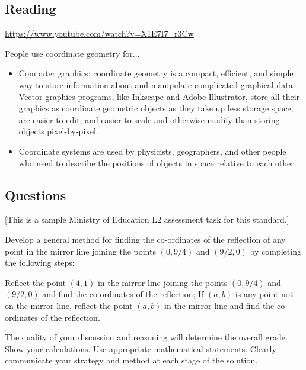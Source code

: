 



\subsection*{Reading}
\begin{center}
\begin{tcolorbox}[width=0.8\textwidth,colback={white},title={\textbf{Go and watch...}},colbacktitle=black,coltitle=white]
  \textcolor{black}{\url{https://www.youtube.com/watch?v=X1E7I7_r3Cw}}
\end{tcolorbox}
\end{center}

\begin{center}
\begin{tcolorbox}[width=0.8\textwidth,colback={white},title={\textbf{What's it good for?}},colbacktitle=MidnightBlue,coltitle=white]
  People use coordinate geometry for...
  \begin{itemize}
    \item Computer graphics: coordinate geometry is a compact, efficient, and simple way to store information about and manipulate
          complicated graphical data. Vector graphics programs, like Inkscape and Adobe Illustrator, store all their graphics as
          coordinate geometric objects as they take up less storage space, are easier to edit, and easier to scale and otherwise modify
          than storing objects pixel-by-pixel.
    \item Coordinate systems are used by physicists, geographers, and other people who need to describe the positions of objects in
          space relative to each other.
  \end{itemize}
\end{tcolorbox}
\end{center}

\subsection*{Questions}
[This is a sample Ministry of Education L2 assessment task for this standard.]

Develop a general method for finding the co-ordinates of the reflection of any point in the mirror line joining the points $ (0, 9/4) $ and $ (9/2, 0) $ by
completing the following steps:
\begin{questions}
  \question Reflect the point $ (4, 1) $ in the mirror line joining the points $ (0, 9/4) $ and $ (9/2, 0) $ and find the co-ordinates of the reflection;
  \question If $ (a, b) $ is any point not on the mirror line, reflect the point $ (a, b) $ in the mirror line and find the co-ordinates of the reflection.
\end{questions}

The quality of your discussion and reasoning will determine the overall grade. Show your calculations. Use appropriate mathematical statements. Clearly
communicate your strategy and method at each stage of the solution.

